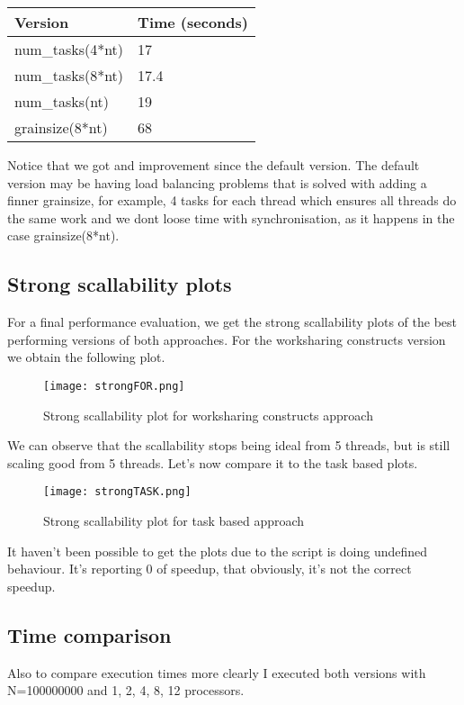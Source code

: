\begin{table}[!h]
\begin{tabular}{|l|l|}
\hline
Version          & Time (seconds) \\ \hline
num\_tasks(4*nt) & 17             \\ \hline
num\_tasks(8*nt) & 17.4           \\ \hline
num\_tasks(nt)   & 19             \\ \hline
grainsize(8*nt)  & 68             \\ \hline
\end{tabular}
\end{table}
\justify
Notice that we got and improvement since the default version. The default version may be having load balancing problems that is solved with adding a finner grainsize, for example, 4 tasks for each thread which ensures all threads do the same work and we dont loose time with synchronisation, as it happens in the case grainsize(8*nt).  

\subsection{Strong scallability plots}
For a final performance evaluation, we get the strong scallability plots of the best performing versions of both approaches.
\justify
For the worksharing constructs version we obtain the following plot.

\begin{figure}[h!]
    \centering
    \texttt{[image: strongFOR.png]}
    \caption{Strong scallability plot for worksharing constructs approach}
\end{figure}

We can observe that the scallability stops being ideal from 5 threads, but is still scaling good from 5 threads. Let's now compare it to the task based plots.

\begin{figure}[h!]
    \centering
    \texttt{[image: strongTASK.png]}
    \caption{Strong scallability plot for task based approach}
\end{figure}

It haven't been possible to get the plots due to the script is doing undefined behaviour. It's reporting 0 of speedup, that obviously, it's not the correct speedup.

\subsection{Time comparison}
Also to compare execution times more clearly I executed both versions with N=100000000 and 1, 2, 4, 8, 12 processors.


